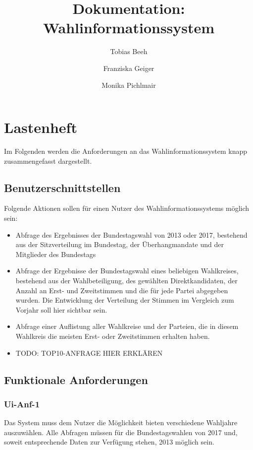 \documentclass[a4paper]{scrreprt}
\begin{document}
 
\title{Dokumentation: Wahlinformationssystem}
\author{Tobias Beeh \and Franziska Geiger \and Monika Pichlmair}
\maketitle
 
\tableofcontents
 
\chapter{Lastenheft}

Im Folgenden werden die Anforderungen an das Wahlinformationssystem knapp zusammengefasst dargestellt.

\section{Benutzerschnittstellen}

Folgende Aktionen sollen für einen Nutzer des Wahlinformationssystems möglich sein: 

\begin{itemize}
\item Abfrage des Ergebnisses der Bundestagswahl von 2013 oder 2017, bestehend aus der Sitzverteilung im Bundestag, der Überhangmandate und der Mitglieder des Bundestags
\item Abfrage der Ergebnisse der Bundestagswahl eines beliebigen Wahlkreises, bestehend aus der Wahlbeteiligung, des gewählten Direktkandidaten, der Anzahl an Erst- und Zweitstimmen und die für jede Partei abgegeben wurden. Die Entwicklung der Verteilung der Stimmen im Vergleich zum Vorjahr soll hier sichtbar sein. 
\item Abfrage einer Auflistung aller Wahlkreise und der Parteien, die in diesem Wahlkreis die meisten Erst- oder Zweitstimmen erhalten haben. 
\item TODO: TOP10-ANFRAGE HIER ERKLÄREN
\end{itemize}

\section{Funktionale Anforderungen}

\subsection{Ui-Anf-1}

Das System muss dem Nutzer die Möglichkeit bieten verschiedene Wahljahre auszuwählen. Alle Abfragen müssen für die Bundestagswahlen von 2017 und, soweit entsprechende Daten zur Verfügung stehen, 2013 möglich sein. 
\end{document}
